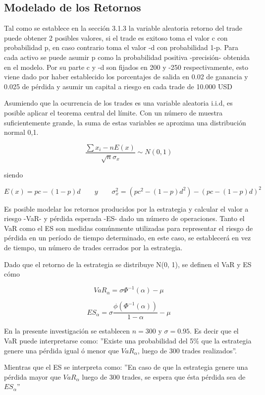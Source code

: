 \documentclass[a4paper,12pt]{Latex/Classes/PhDthesisPSnPDF}
\begin{document}
\subsection{Modelado de los Retornos}

Tal como se establece en la sección 3.1.3 la variable aleatoria retorno del trade puede obtener 2 posibles valores, si el trade es exitoso toma el valor c con probabilidad p, en caso contrario toma el valor -d con probabilidad 1-p. Para cada activo se puede asumir p como la probabilidad positiva -precisión- obtenida en el modelo. Por su parte c y -d son fijados en 200 y -250 respectivamente, esto viene dado por haber establecido los porcentajes de salida en 0.02 de ganancia y 0.025 de pérdida y asumir un capital a riesgo en cada trade de 10.000 USD

Asumiendo que la ocurrencia de los trades es una variable aleatoria i.i.d, es posible aplicar el teorema central del límite. Con un número de muestra suficientemente grande, la suma de estas variables se aproxima una distribución normal 0,1.

$$ \frac{\sum x_{i} - nE(x)}{\sqrt{n}\sigma_{x}} \sim N(0,1) $$

siendo

$$ E(x) = pc - (1-p)d \qquad y \qquad \sigma^{2}_{x} = (pc^{2} - (1-p)d^{2}) - (pc - (1-p)d)^{2} $$

Es posible modelar los retornos producidos por la estrategia y calcular el valor a riesgo -VaR- y pérdida esperada -ES- dado un número de operaciones. Tanto el VaR como el ES son medidas comúnmente utilizadas para representar el riesgo de pérdida en un período de tiempo determinado, en este caso, se establecerá en vez de tiempo, un número de trades cerrados por la estrategia.

Dado que el retorno de la estrategia se distribuye N(0, 1), se definen el VaR y ES cómo

$$ VaR_{\alpha} = \sigma \Phi^{-1}(\alpha) - \mu $$

$$ ES_{\alpha} = \sigma \frac{\phi(\Phi^{-1}(\alpha))}{1-\alpha} - \mu $$

En la presente investigación se establecen $n = 300$ y $\sigma = 0.95$. Es decir que el VaR puede interpretarse como: ''Existe una probabilidad del 5\% que la estrategia genere una pérdida igual ó menor que $VaR_{\alpha}$, luego de 300 trades realizados''.

Mientras que el ES se interpreta como: ''En caso de que la estrategia genere una pérdida mayor que $VaR_{\alpha}$ luego de 300 trades, se espera que ésta pérdida sea de $ES_{\alpha}$''
\end{document}
